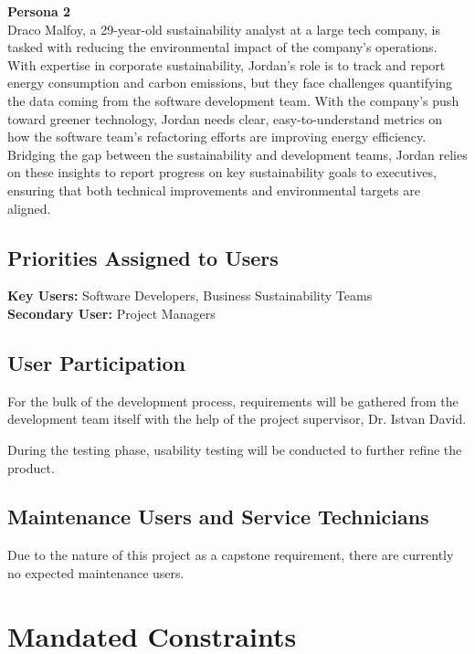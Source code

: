 \documentclass[12pt]{article}
\begin{document}
\noindent
\textbf{Persona 2} \\
Draco Malfoy, a 29-year-old sustainability analyst at a large tech company, is tasked with reducing the environmental impact of the company’s operations. With expertise in corporate sustainability, Jordan’s role is to track and report energy consumption and carbon emissions, but they face challenges quantifying the data coming from the software development team. With the company's push toward greener technology, Jordan needs clear, easy-to-understand metrics on how the software team’s refactoring efforts are improving energy efficiency. Bridging the gap between the sustainability and development teams, Jordan relies on these insights to report progress on key sustainability goals to executives, ensuring that both technical improvements and environmental targets are aligned.

\subsection{Priorities Assigned to Users}
\textbf{Key Users:} Software Developers, Business Sustainability Teams \\
\textbf{Secondary User:} Project Managers

\subsection{User Participation}
For the bulk of the development process, requirements will be gathered from the development team itself with the help of the project supervisor, Dr. Istvan David.

During the testing phase, usability testing will be conducted to further refine the product.

\subsection{Maintenance Users and Service Technicians}
Due to the nature of this project as a capstone requirement, there are currently no expected maintenance users.

\section{Mandated Constraints}
\end{document}
